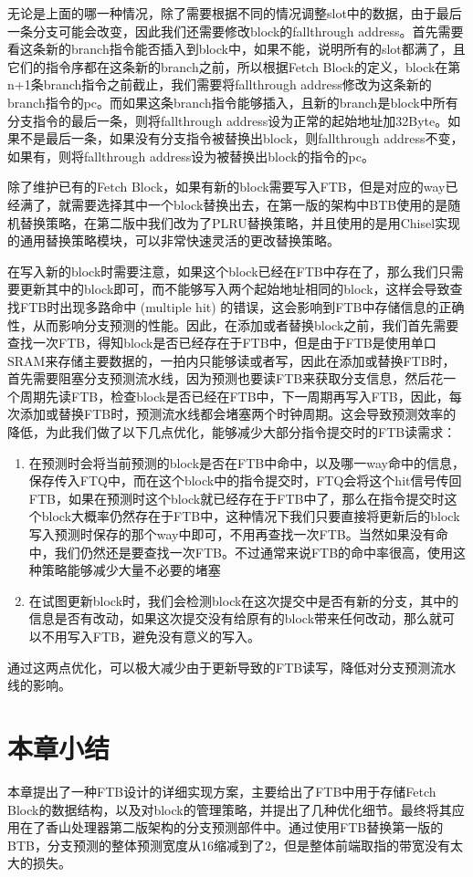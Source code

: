 
无论是上面的哪一种情况，除了需要根据不同的情况调整slot中的数据，由于最后一条分支可能会改变，因此我们还需要修改block的fallthrough address。首先需要看这条新的branch指令能否插入到block中，如果不能，说明所有的slot都满了，且它们的指令序都在这条新的branch之前，所以根据Fetch Block的定义，block在第n+1条branch指令之前截止，我们需要将fallthrough address修改为这条新的branch指令的pc。而如果这条branch指令能够插入，且新的branch是block中所有分支指令的最后一条，则将fallthrough address设为正常的起始地址加32Byte。如果不是最后一条，如果没有分支指令被替换出block，则fallthrough address不变，如果有，则将fallthrough address设为被替换出block的指令的pc。

除了维护已有的Fetch Block，如果有新的block需要写入FTB，但是对应的way已经满了，就需要选择其中一个block替换出去，在第一版的架构中BTB使用的是随机替换策略，在第二版中我们改为了PLRU替换策略，并且使用的是用Chisel实现的通用替换策略模块，可以非常快速灵活的更改替换策略。

在写入新的block时需要注意，如果这个block已经在FTB中存在了，那么我们只需要更新其中的block即可，而不能够写入两个起始地址相同的block，这样会导致查找FTB时出现多路命中 (multiple hit) 的错误，这会影响到FTB中存储信息的正确性，从而影响分支预测的性能。因此，在添加或者替换block之前，我们首先需要查找一次FTB，得知block是否已经存在于FTB中，但是由于FTB是使用单口SRAM来存储主要数据的，一拍内只能够读或者写，因此在添加或替换FTB时，首先需要阻塞分支预测流水线，因为预测也要读FTB来获取分支信息，然后花一个周期先读FTB，检查block是否已经在FTB中，下一周期再写入FTB，因此，每次添加或替换FTB时，预测流水线都会堵塞两个时钟周期。这会导致预测效率的降低，为此我们做了以下几点优化，能够减少大部分指令提交时的FTB读需求：

\begin{enumerate}
	\item 在预测时会将当前预测的block是否在FTB中命中，以及哪一way命中的信息，保存传入FTQ中，而在这个block中的指令提交时，FTQ会将这个hit信号传回FTB，如果在预测时这个block就已经存在于FTB中了，那么在指令提交时这个block大概率仍然存在于FTB中，这种情况下我们只要直接将更新后的block写入预测时保存的那个way中即可，不用再查找一次FTB。当然如果没有命中，我们仍然还是要查找一次FTB。不过通常来说FTB的命中率很高，使用这种策略能够减少大量不必要的堵塞
	\item 在试图更新block时，我们会检测block在这次提交中是否有新的分支，其中的信息是否有改动，如果这次提交没有给原有的block带来任何改动，那么就可以不用写入FTB，避免没有意义的写入。
\end{enumerate}

通过这两点优化，可以极大减少由于更新导致的FTB读写，降低对分支预测流水线的影响。


\section{本章小结}

本章提出了一种FTB设计的详细实现方案，主要给出了FTB中用于存储Fetch Block的数据结构，以及对block的管理策略，并提出了几种优化细节。最终将其应用在了香山处理器第二版架构的分支预测部件中。通过使用FTB替换第一版的BTB，分支预测的整体预测宽度从16缩减到了2，但是整体前端取指的带宽没有太大的损失。
